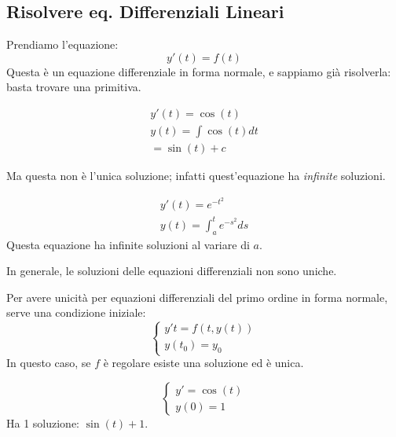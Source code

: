 \subsection{Risolvere eq. Differenziali Lineari}
Prendiamo l'equazione:
\begin{equation*}
    y'(t)=f(t)
\end{equation*}
Questa è un equazione differenziale in forma normale, e sappiamo già risolverla: basta trovare una primitiva.
\begin{esempio}
    \begin{gather*}
        y'(t) = \cos(t) \\
        y(t) = \int \cos(t)dt \\
        = \sin(t) + c
    \end{gather*}
\end{esempio}
Ma questa non è l'unica soluzione; infatti quest'equazione ha \textit{infinite} soluzioni.

\begin{esempio}
    \begin{gather*}
        y'(t) = e^{-t^2} \\
        y(t) = \int_{a}^{t} e^{-s^2} ds
    \end{gather*}
    Questa equazione ha infinite soluzioni al variare di $a$.
\end{esempio}

\begin{osservazione}
    In generale, le soluzioni delle equazioni differenziali non sono uniche.
\end{osservazione}

\begin{proprieta}
Per avere unicità per equazioni differenziali del primo ordine in forma normale, serve una condizione iniziale:
\begin{equation}
    \begin{cases}
        y't = f(t, y(t)) \\
        y(t_0) = y_0
    \end{cases}
\end{equation}
In questo caso, se $f$ è regolare esiste una soluzione ed è unica.
\end{proprieta}

\begin{esempio}
    \begin{equation}
        \begin{cases}
            y' = \cos(t) \\
            y(0) = 1
        \end{cases}
    \end{equation}
    Ha 1 soluzione: $\sin(t)+1$.
\end{esempio}

